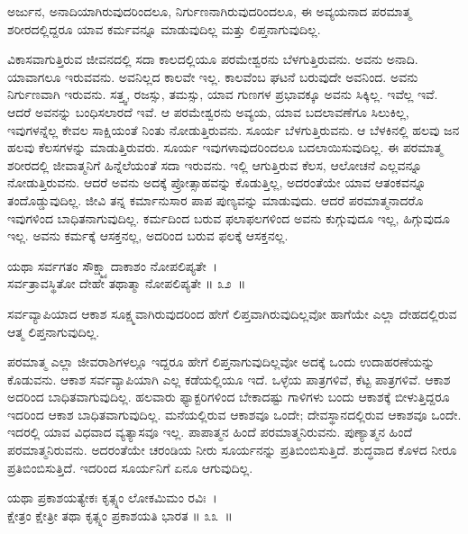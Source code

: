\begin{artha}
ಅರ್ಜುನ, ಅನಾದಿಯಾಗಿರುವುದರಿಂದಲೂ, ನಿರ್ಗುಣನಾಗಿರುವುದರಿಂದಲೂ, ಈ ಅವ್ಯಯನಾದ ಪರಮಾತ್ಮ ಶರೀರದಲ್ಲಿದ್ದರೂ ಯಾವ ಕರ್ಮವನ್ನೂ ಮಾಡುವುದಿಲ್ಲ ಮತ್ತು ಲಿಪ್ತನಾಗುವುದಿಲ್ಲ.
\end{artha}

ವಿಕಾಸವಾಗುತ್ತಿರುವ ಜೀವನದಲ್ಲಿ ಸದಾ ಕಾಲದಲ್ಲಿಯೂ ಪರಮೇಶ್ವರನು ಬೆಳಗುತ್ತಿರುವನು. ಅವನು ಅನಾದಿ. ಯಾವಾಗಲೂ ಇರುವವನು. ಅವನಿಲ್ಲದ ಕಾಲವೇ ಇಲ್ಲ. ಕಾಲವೆಂಬ ಘಟನೆ ಬರುವುದೇ ಅವನಿಂದ. ಅವನು ನಿರ್ಗುಣವಾಗಿ ಇರುವನು. ಸತ್ತ್ವ, ರಜಸ್ಸು, ತಮಸ್ಸು, ಯಾವ ಗುಣಗಳ ಪ್ರಭಾವಕ್ಕೂ ಅವನು ಸಿಕ್ಕಿಲ್ಲ. ಇವೆಲ್ಲ ಇವೆ. ಆದರೆ ಅವನನ್ನು ಬಂಧಿಸಲಾರದೆ ಇವೆ. ಆ ಪರಮೇಶ್ವರನು ಅವ್ಯಯ, ಯಾವ ಬದಲಾವಣೆಗೂ ಸಿಲುಕಿಲ್ಲ, ಇವುಗಳನ್ನೆಲ್ಲ ಕೇವಲ ಸಾಕ್ಷಿಯಂತೆ ನಿಂತು ನೋಡುತ್ತಿರುವನು. ಸೂರ್ಯ ಬೆಳಗುತ್ತಿರುವನು. ಆ ಬೆಳಕಿನಲ್ಲಿ ಹಲವು ಜನ ಹಲವು ಕೆಲಸಗಳನ್ನು ಮಾಡುತ್ತಿರುವರು. ಸೂರ್ಯ ಇವುಗಳಾವುದರಿಂದಲೂ ಬದಲಾಯಿಸುವುದಿಲ್ಲ. ಈ ಪರಮಾತ್ಮ ಶರೀರದಲ್ಲಿ ಜೀವಾತ್ಮನಿಗೆ ಹಿನ್ನೆಲೆಯಂತೆ ಸದಾ ಇರುವನು. ಇಲ್ಲಿ ಆಗುತ್ತಿರುವ ಕೆಲಸ, ಆಲೋಚನೆ ಎಲ್ಲವನ್ನೂ ನೋಡುತ್ತಿರುವನು. ಆದರೆ ಅವನು ಅದಕ್ಕೆ ಪ್ರೋತ್ಸಾಹವನ್ನು ಕೊಡುತ್ತಿಲ್ಲ, ಅದರಂತೆಯೇ ಯಾವ ಆತಂಕವನ್ನೂ ತಂದೊಡ್ಡುವುದಿಲ್ಲ. ಜೀವಿ ತನ್ನ ಕರ್ಮಾನುಸಾರ ಪಾಪ ಪುಣ್ಯವನ್ನು ಮಾಡುವುದು. ಆದರೆ ಪರಮಾತ್ಮನಾದರೊ ಇವುಗಳಿಂದ ಬಾಧಿತನಾಗುವುದಿಲ್ಲ. ಕರ್ಮದಿಂದ ಬರುವ ಫಲಾಫಲಗಳಿಂದ ಅವನು ಕುಗ್ಗುವುದೂ ಇಲ್ಲ, ಹಿಗ್ಗುವುದೂ ಇಲ್ಲ. ಅವನು ಕರ್ಮಕ್ಕೆ ಆಸಕ್ತನಲ್ಲ, ಅದರಿಂದ ಬರುವ ಫಲಕ್ಕೆ ಆಸಕ್ತನಲ್ಲ.

\begin{shloka}
ಯಥಾ ಸರ್ವಗತಂ ಸೌಕ್ಷ್ಮ್ಯಾದಾಕಾಶಂ ನೋಪಲಿಪ್ಯತೇ~।\\ಸರ್ವತ್ರಾವಸ್ಥಿತೋ ದೇಹೇ ತಥಾತ್ಮಾ ನೋಪಲಿಪ್ಯತೇ \hfill॥ ೩೨~॥
\end{shloka}

\begin{artha}
ಸರ್ವವ್ಯಾಪಿಯಾದ ಆಕಾಶ ಸೂಕ್ಷ್ಮವಾಗಿರುವುದರಿಂದ ಹೇಗೆ ಲಿಪ್ತವಾಗಿರುವುದಿಲ್ಲವೋ ಹಾಗೆಯೇ ಎಲ್ಲಾ ದೇಹದಲ್ಲಿರುವ ಆತ್ಮ ಲಿಪ್ತನಾಗುವುದಿಲ್ಲ.
\end{artha}

ಪರಮಾತ್ಮ ಎಲ್ಲಾ ಜೀವರಾಶಿಗಳಲ್ಲೂ ಇದ್ದರೂ ಹೇಗೆ ಲಿಪ್ತನಾಗುವುದಿಲ್ಲವೋ ಅದಕ್ಕೆ ಒಂದು ಉದಾಹರಣೆಯನ್ನು ಕೊಡುವನು. ಆಕಾಶ ಸರ್ವವ್ಯಾಪಿಯಾಗಿ ಎಲ್ಲ ಕಡೆಯಲ್ಲಿಯೂ ಇದೆ. ಒಳ್ಳೆಯ ಪಾತ್ರಗಳಿವೆ, ಕೆಟ್ಟ ಪಾತ್ರಗಳಿವೆ. ಆಕಾಶ ಅದರಿಂದ ಬಾಧಿತವಾಗುವುದಿಲ್ಲ. ಹಲವಾರು ಫ್ಯಾಕ್ಟರಿಗಳಿಂದ ಬೇಕಾದಷ್ಟು ಗಾಳಿಗಳು ಬಂದು ಆಕಾಶಕ್ಕೆ ಬೀಳುತ್ತಿದ್ದರೂ ಇದರಿಂದ ಆಕಾಶ ಬಾಧಿತವಾಗುವುದಿಲ್ಲ. ಮನೆಯಲ್ಲಿರುವ ಆಕಾಶವೂ ಒಂದೇ; ದೇವಸ್ಥಾನದಲ್ಲಿರುವ ಆಕಾಶವೂ ಒಂದೇ. ಇದರಲ್ಲಿ ಯಾವ ವಿಧವಾದ ವ್ಯತ್ಯಾಸವೂ ಇಲ್ಲ. ಪಾಪಾತ್ಮನ ಹಿಂದೆ ಪರಮಾತ್ಮನಿರುವನು. ಪುಣ್ಯಾತ್ಮನ ಹಿಂದೆ ಪರಮಾತ್ಮನಿರುವನು. ಅದರಂತೆಯೇ ಚರಂಡಿಯ ನೀರು ಸೂರ್ಯನನ್ನು ಪ್ರತಿಬಿಂಬಿಸುತ್ತಿದೆ. ಶುದ್ಧವಾದ ಕೊಳದ ನೀರೂ ಪ್ರತಿಬಿಂಬಿಸುತ್ತಿದೆ. ಇದರಿಂದ ಸೂರ್ಯನಿಗೆ ಏನೂ ಆಗುವುದಿಲ್ಲ.

\begin{shloka}
ಯಥಾ ಪ್ರಕಾಶಯತ್ಯೇಕಃ ಕೃತ್ಸ್ನಂ ಲೋಕಮಿಮಂ ರವಿಃ~।\\ಕ್ಷೇತ್ರಂ ಕ್ಷೇತ್ರೀ ತಥಾ ಕೃತ್ಸ್ನಂ ಪ್ರಕಾಶಯತಿ ಭಾರತ \hfill॥ ೩೩~॥
\end{shloka}

